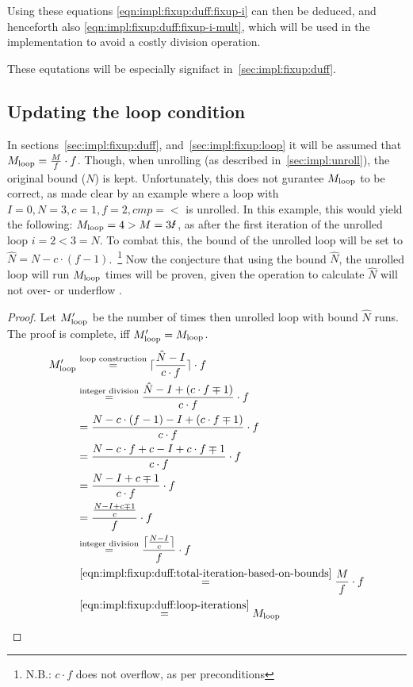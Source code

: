 Using these equations \cref{eqn:impl:fixup:duff:fixup-i} can then be deduced, and henceforth also \cref{eqn:impl:fixup:duff:fixup-i-mult}, which will be used in the implementation to avoid a costly division operation.

These equtations will be especially signifact in~\cref{sec:impl:fixup:duff}.

\subsection{Updating the loop condition}\label{sec:impl:fixup:header-cond}

In sections~\ref{sec:impl:fixup:duff}, and~\ref{sec:impl:fixup:loop} it will be assumed that $M_{\text{loop}} = \frac{M}{f} \cdot f$.
Though, when unrolling (as described in~\cref{sec:impl:unroll}), the original bound ($N$) is kept.
Unfortunately, this does not gurantee $M_{\text{loop}}$ to be correct, as made clear by an example where a loop with $I = 0, N = 3, c = 1, f = 2, cmp = <$ is unrolled.
In this example, this would yield the following: $\Mloop = 4 > M = 3 \mLightning$, as after the first iteration of the unrolled loop $i = 2 < 3 = N$.
To combat this, the bound of the unrolled loop will be set to $\hat{N} = N - c \cdot (f - 1)$.~\footnote{N.B.: $c \cdot f$ does not overflow, as per preconditions}
Now the conjecture that using the bound $\hat{N}$, the unrolled loop will run $M_{\text{loop}}$ times will be proven, given the operation to calculate $\hat{N}$ will not over- or underflow .
\begin{proof}
    Let $M_{\text{loop}}'$ be the number of times then unrolled loop with bound $\hat{N}$ runs.
    The proof is complete, iff $M_{\text{loop}}' = M_{\text{loop}}$.
    \begin{align*}
        M_{\text{loop}}' &\overset{\text{loop construction}}{=} \lceil{}\frac{\hat{N} - I}{c \cdot f}\rceil{} \cdot f\\
        &\overset{\text{integer division}}{=} \frac{\hat{N} - I + (c \cdot f \mp 1)}{c \cdot f} \cdot f\\
        &= \frac{N - c \cdot (f - 1) - I + (c \cdot f \mp 1)}{c \cdot f} \cdot f\\
        &= \frac{N - c \cdot f + c - I + c \cdot f \mp 1}{c \cdot f} \cdot f\\
        &= \frac{N - I + c \mp 1}{c \cdot f} \cdot f\\
        &= \frac{\frac{N - I + c \mp 1}{c}}{f} \cdot f\\
        &\overset{\text{integer division}}{=} \frac{\lceil{}\frac{N - I}{c}\rceil{}}{f} \cdot f\\
        &\overset{\ref{eqn:impl:fixup:duff:total-iteration-based-on-bounds}}{=} \frac{M}{f} \cdot f\\
        &\overset{\ref{eqn:impl:fixup:duff:loop-iterations}}{=} M_{\text{loop}}
    \end{align*}
\end{proof}

